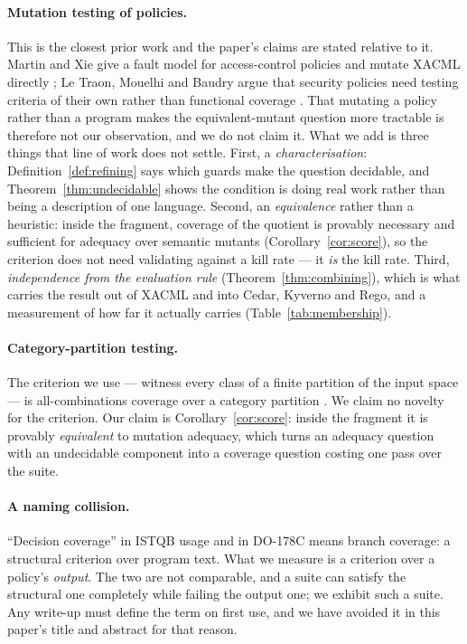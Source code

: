 \documentclass[11pt,a4paper]{article}
\theoremstyle{plain}
\theoremstyle{definition}
\theoremstyle{remark}
\begin{document}
\paragraph{Mutation testing of policies.} This is the closest prior work and the paper's
claims are stated relative to it. Martin and Xie give a fault model for access-control
policies and mutate XACML directly \cite{martin2007fault}; Le Traon, Mouelhi and Baudry
argue that security policies need testing criteria of their own rather than functional
coverage \cite{letraon2007testing}. That mutating a policy rather than a program makes the
equivalent-mutant question more tractable is therefore not our observation, and we do not
claim it. What we add is three things that line of work does not settle. First, a
\emph{characterisation}: Definition~\ref{def:refining} says which guards make the question
decidable, and Theorem~\ref{thm:undecidable} shows the condition is doing real work rather
than being a description of one language. Second, an \emph{equivalence} rather than a
heuristic: inside the fragment, coverage of the quotient is provably necessary and
sufficient for adequacy over semantic mutants (Corollary~\ref{cor:score}), so the criterion
does not need validating against a kill rate --- it \emph{is} the kill rate. Third,
\emph{independence from the evaluation rule} (Theorem~\ref{thm:combining}), which is what
carries the result out of XACML and into Cedar, Kyverno and Rego, and a measurement of how
far it actually carries (Table~\ref{tab:membership}).

\paragraph{Category-partition testing.} The criterion we use --- witness every class of a
finite partition of the input space --- is all-combinations coverage over a category
partition \cite{ostrand1988category}. We claim no novelty for the criterion. Our claim is
Corollary~\ref{cor:score}: inside the fragment it is provably \emph{equivalent} to mutation
adequacy, which turns an adequacy question with an undecidable component into a coverage
question costing one pass over the suite.

\paragraph{A naming collision.} ``Decision coverage'' in ISTQB usage and in DO-178C
\cite{do178c} means branch coverage: a structural criterion over program text. What we
measure is a criterion over a policy's \emph{output}. The two are not comparable, and a
suite can satisfy the structural one completely while failing the output one; we exhibit
such a suite. Any write-up must define the term on first use, and we have avoided it in this
paper's title and abstract for that reason.
\end{document}

